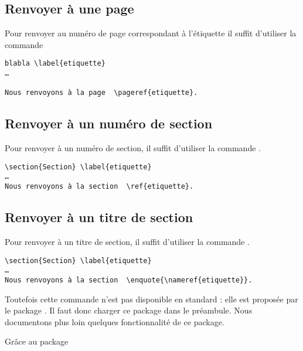 \subsection{Renvoyer à une page}

Pour renvoyer au numéro de page correspondant à l'étiquette  il suffit d'utiliser la commande 

\begin{verbatim}
blabla \label{etiquette}
…

Nous renvoyons à la page  \pageref{etiquette}.
\end{verbatim}

\subsection{Renvoyer à un numéro de section}

Pour renvoyer à un numéro de section, il suffit d'utiliser la commande .

\begin{verbatim}
\section{Section} \label{etiquette}
…
Nous renvoyons à la section  \ref{etiquette}.
\end{verbatim}
 
\subsection{Renvoyer à un titre de section}

Pour renvoyer à un titre de section, il suffit d'utiliser la commande .

\begin{verbatim}
\section{Section} \label{etiquette}
…
Nous renvoyons à la section  \enquote{\nameref{etiquette}}.
\end{verbatim}

Toutefois cette commande n'est pas disponible en standard : elle est proposée par le package . Il faut donc charger ce package dans le préambule. Nous documentons plus loin quelques fonctionnalité de ce package.

\begin{anedocte}
 Grâce au package  
\end{anedocte}
